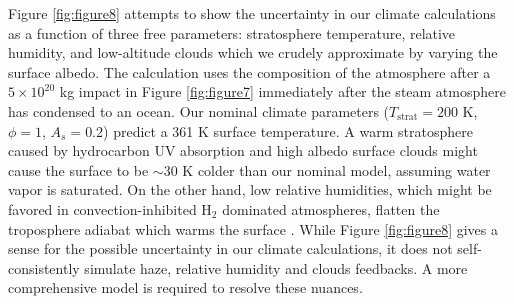 Figure \ref{fig:figure8} attempts to show the uncertainty in our climate calculations as a function of three free parameters: stratosphere temperature, relative humidity, and low-altitude clouds which we crudely approximate by varying the surface albedo. The calculation uses the composition of the atmosphere after a $5 \times 10^{20}$ kg impact in Figure \ref{fig:figure7} immediately after the steam atmosphere has condensed to an ocean. Our nominal climate parameters ($T_\mathrm{strat} = 200$ K, $\phi = 1$, $A_s = 0.2$) predict a 361 K surface temperature. A warm stratosphere caused by hydrocarbon UV absorption and high albedo surface clouds might cause the surface to be $\sim 30$ K colder than our nominal model, assuming water vapor is saturated. On the other hand, low relative humidities, which might be favored in convection-inhibited H$_2$ dominated atmospheres, flatten the troposphere adiabat which warms the surface \citep{Leconte_2017}. While Figure \ref{fig:figure8} gives a sense for the possible uncertainty in our climate calculations, it does not self-consistently simulate haze, relative humidity and clouds feedbacks. A more comprehensive model is required to resolve these nuances.

